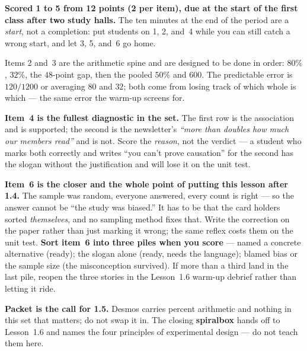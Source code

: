 \documentclass[10pt]{article}
\begin{document}
\boxguard[26]
\begin{teachernote}[Homework]
\textbf{Scored 1 to 5 from 12 points (2 per item), due at the start of the first class after two study
halls.} The ten minutes at the end of the period are a \emph{start}, not a completion: put
students on 1, 2, and~4 while you can still catch a wrong start, and let 3, 5, and~6 go home.

Items 2 and~3 are the arithmetic spine and are designed to be done in order: $80\%$, $32\%$,
the $48$-point gap, then the pooled $50\%$ and $600$. The predictable error is $120/1200$ or
averaging $80$ and $32$; both come from losing track of which whole is which --- the same error
the warm-up screens for.

\textbf{Item~4 is the fullest diagnostic in the set.} The first row is the association and is
supported; the second is the newsletter's \emph{``more than doubles how much our members
read''} and is not. Score the \emph{reason}, not the verdict --- a student who marks both
correctly and writes ``you can't prove causation'' for the second has the slogan without the
justification and will lose it on the unit test.

\textbf{Item~6 is the closer and the whole point of putting this lesson after 1.4.} The sample
was random, everyone answered, every count is right --- so the answer cannot be ``the study was
biased.'' It has to be that the card holders sorted \emph{themselves}, and no sampling method
fixes that. Write the correction on the paper rather than just marking it wrong; the same
reflex costs them on the unit test. \textbf{Sort item~6 into three piles when you score} ---
named a concrete alternative (ready); the slogan alone (ready, needs the language); blamed bias
or the sample size (the misconception survived). If more than a third land in the last pile,
reopen the three stories in the Lesson~1.6 warm-up debrief rather than letting it ride.

\textbf{Packet is the call for 1.5.} Desmos carries percent arithmetic and nothing in this set
that matters; do not swap it in. The closing \textbf{spiralbox} hands off to Lesson~1.6 and
names the four principles of experimental design --- do not teach them here.
\end{teachernote}
\end{document}
